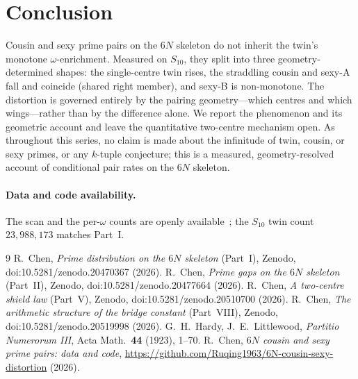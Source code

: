 \documentclass[11pt]{article}
\begin{document}
\section{Conclusion}

Cousin and sexy prime pairs on the $6N$ skeleton do not inherit the twin's
monotone $\omega$-enrichment. Measured on $S_{10}$, they split into three
geometry-determined shapes: the single-centre twin rises, the straddling
cousin and sexy-A fall and coincide (shared right member), and sexy-B is
non-monotone. The distortion is governed entirely by the pairing geometry---which
centres and which wings---rather than by the difference alone. We report the
phenomenon and its geometric account and leave the quantitative two-centre
mechanism open. As throughout this series, no claim is made about the infinitude
of twin, cousin, or sexy primes, or any $k$-tuple conjecture; this is a measured,
geometry-resolved account of conditional pair rates on the $6N$ skeleton.

\paragraph{Data and code availability.}
The scan and the per-$\omega$ counts are openly available~\cite{repo}; the
$S_{10}$ twin count $23{,}988{,}173$ matches Part~I.

\begin{thebibliography}{9}
 R.~Chen, \emph{Prime distribution on the $6N$ skeleton} (Part~I),
Zenodo, doi:10.5281/zenodo.20470367 (2026).
 R.~Chen, \emph{Prime gaps on the $6N$ skeleton} (Part~II),
Zenodo, doi:10.5281/zenodo.20477664 (2026).
 R.~Chen, \emph{A two-centre shield law} (Part~V), Zenodo,
doi:10.5281/zenodo.20510700 (2026).
 R.~Chen, \emph{The arithmetic structure of the bridge
constant} (Part~VIII), Zenodo, doi:10.5281/zenodo.20519998 (2026).
 G.~H.~Hardy, J.~E.~Littlewood, \emph{Partitio Numerorum III}, Acta
Math.\ \textbf{44} (1923), 1--70.
 R.~Chen, \emph{$6N$ cousin and sexy prime pairs: data and code},
\url{https://github.com/Ruqing1963/6N-cousin-sexy-distortion} (2026).
\end{thebibliography}
\end{document}
